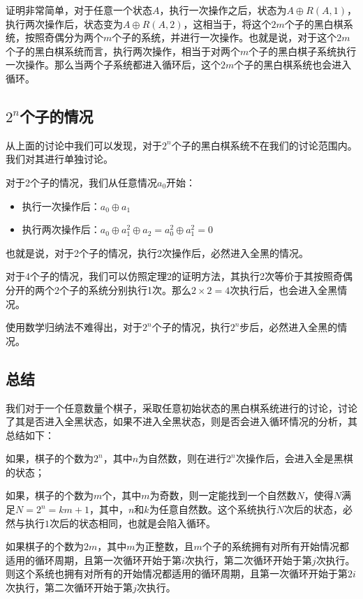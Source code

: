 \documentclass[12pt,AutoFakeSlant,AutoFakeBold]{article}
\newcommand{\nor}{\oplus}
\begin{document}
证明非常简单，对于任意一个状态$A$，执行一次操作之后，状态为$A\nor R(A,1)$，执行两次操作后，状态变为$A\nor R(A,2)$，这相当于，将这个$2m$个子的黑白棋系统，按照奇偶分为两个$m$个子的系统，并进行一次操作。也就是说，对于这个$2m$个子的黑白棋系统而言，执行两次操作，相当于对两个$m$个子的黑白棋子系统执行一次操作。那么当两个子系统都进入循环后，这个$2m$个子的黑白棋系统也会进入循环。

\subsection{\texorpdfstring{$2^n$}{2\^n}个子的情况}

从上面的讨论中我们可以发现，对于$2^n$个子的黑白棋系统不在我们的讨论范围内。我们对其进行单独讨论。

对于2个子的情况，我们从任意情况$a_0$开始：

\begin{itemize}
    \item 执行一次操作后：$a_0\nor a_1$
    \item 执行两次操作后：$a_0\nor a_1^2 \nor a_2 = a_0^2 \nor a_1^2 = 0$
\end{itemize}

也就是说，对于2个子的情况，执行2次操作后，必然进入全黑的情况。

对于4个子的情况，我们可以仿照定理2的证明方法，其执行2次等价于其按照奇偶分开的两个2个子的系统分别执行1次。那么$2\times 2 = 4$次执行后，也会进入全黑情况。

使用数学归纳法不难得出，对于$2^n$个子的情况，执行$2^n$步后，必然进入全黑的情况。

\subsection{总结}

我们对于一个任意数量个棋子，采取任意初始状态的黑白棋系统进行的讨论，讨论了其是否进入全黑状态，如果不进入全黑状态，则是否会进入循环情况的分析，其总结如下：

\begin{enumerate*}
    \item 如果，棋子的个数为$2^n$，其中$n$为自然数，则在进行$2^n$次操作后，会进入全是黑棋的状态；
    \item 如果，棋子的个数为$m$个，其中$m$为奇数，则一定能找到一个自然数$N$，使得$N$满足$N=2^n=km+1$，其中，$n$和$k$为任意自然数。这个系统执行$N$次后的状态，必然与执行$1$次后的状态相同，也就是会陷入循环。
    \item 如果棋子的个数为$2m$，其中$m$为正整数，且$m$个子的系统拥有对所有开始情况都适用的循环周期，且第一次循环开始于第$i$次执行，第二次循环开始于第$j$次执行。则这个系统也拥有对所有的开始情况都适用的循环周期，且第一次循环开始于第$2i$次执行，第二次循环开始于第$j$次执行。
\end{enumerate*}
\end{document}
